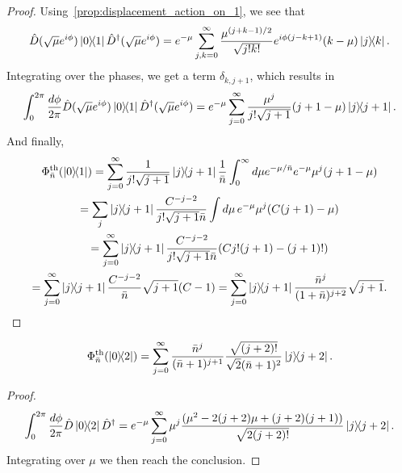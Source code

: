 \documentclass[12pt]{report}
\begin{document}
\begin{proof}
	Using~\cref{prop:displacement_action_on_1}, we see that
	\begin{equation}
		\hat D(\sqrt\mu e^{i\phi})\ketbra{0}{1} \hat D^\dagger(\sqrt\mu e^{i\phi})
		= e^{-\mu} \sum_{j,k=0}^\infty
		\frac{\mu^{(j+k-1)/2}}{\sqrt{j!k!}}
		e^{i\phi(j-k+1)} (k-\mu) \ketbra{j}{k}.
	\end{equation}
	Integrating over the phases, we get a term $\delta_{k,j+1}$, which results in
	\begin{equation}
		\int_0^{2\pi} \frac{d\phi}{2\pi}
		\hat D(\sqrt\mu e^{i\phi})\ketbra{0}{1} \hat D^\dagger(\sqrt\mu e^{i\phi})
		= e^{-\mu} \sum_{j=0}^\infty
		\frac{\mu^j}{j!\sqrt{j+1}} (j+1-\mu) \ketbra{j}{j+1}.
	\end{equation}
	And finally,
	\begin{equation}
	\begin{gathered}
		\Phi^{\rm th}_{\bar n}(\ketbra{0}{1})
		= \sum_{j=0}^\infty \frac{1}{j!\sqrt{j+1}} \ketbra{j}{j+1} \frac{1}{\bar n}
		\int_0^\infty d\mu
		e^{-\mu/\bar n} e^{-\mu} \mu^j (j+1-\mu) \\
		= \sum_j \ketbra{j}{j+1} \frac{C^{-j-2}}{j!\sqrt{j+1}\bar n}
		\int d\mu \, e^{-\mu} \mu^j (C(j+1) - \mu) \\
		= \sum_{j=0}^\infty \ketbra{j}{j+1} \frac{C^{-j-2}}{j!\sqrt{j+1}\bar n}
		(C j! (j+1) - (j+1)!) \\
		= \sum_{j=0}^\infty \ketbra{j}{j+1} \frac{C^{-j-2}}{\bar n} \sqrt{j+1} (C-1)
		= \sum_{j=0}^\infty \ketbra{j}{j+1}
			\frac{\bar n^{j}}{(1+\bar n)^{j+2}} \sqrt{j+1}.
	\end{gathered}
	\end{equation}
\end{proof}

\begin{prop}\label{prop:thermalisation_applied_to_02}
	\begin{equation}
		\Phi_{\bar n}^{\rm th}(\ketbra{0}{2})
		= \sum_{j=0}^\infty
		\frac{\bar n^j}{(\bar n + 1)^{j+1}}
		\frac{\sqrt{(j+2)!}}{\sqrt2 (\bar n + 1)^2}
		\ketbra{j}{j+2}.
	\end{equation}
\end{prop}
\begin{proof}
	\begin{equation}
	\begin{gathered}
		\int_0^{2\pi} \frac{d\phi}{2\pi}
		\hat D \ketbra{0}{2} \hat D^\dagger
		= e^{-\mu} \sum_{j=0}^\infty
		\mu^j\frac{(\mu^2 - 2 (j+2) \mu + (j+2)(j+1))}{\sqrt{2(j+2)!}}
		\ketbra{j}{j+2}.
	\end{gathered}
	\end{equation}
	Integrating over $\mu$ we then reach the conclusion.
\end{proof}
\end{document}
